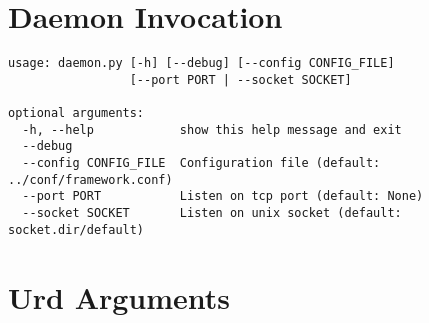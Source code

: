 \section{Daemon Invocation}

\begin{verbatim}
usage: daemon.py [-h] [--debug] [--config CONFIG_FILE]
                 [--port PORT | --socket SOCKET]

optional arguments:
  -h, --help            show this help message and exit
  --debug
  --config CONFIG_FILE  Configuration file (default: ../conf/framework.conf)
  --port PORT           Listen on tcp port (default: None)
  --socket SOCKET       Listen on unix socket (default: socket.dir/default)
\end{verbatim}

\section{Urd Arguments}

